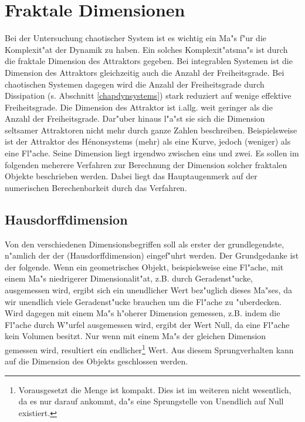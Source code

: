 
\newpage
\newpage
\section{Fraktale Dimensionen}
Bei der Untersuchung chaotischer System ist es wichtig ein Ma"s f"ur die Komplexit"at der
Dynamik zu haben. Ein solches Komplexit"atsma"s ist durch die fraktale Dimension des Attraktors
gegeben. Bei integrablen Systemen ist die Dimension des Attraktors gleichzeitig auch die Anzahl der 
Freiheitsgrade. Bei chaotischen Systemen dagegen wird die Anzahl der Freiheitsgrade durch
Dissipation (s. Abschnitt \ref{chapdynsystems}) stark reduziert auf wenige effektive
Freiheitsgrade. Die Dimension des Attraktor ist i.allg. weit geringer als die Anzahl der
Freiheitsgrade. Dar"uber hinaus l"a"st sie sich  die Dimension seltsamer Attraktoren nicht
mehr durch ganze Zahlen 
beschreiben. Beispielsweise ist der Attraktor des H\'enonsystems \naja(mehr) als eine
Kurve, jedoch \naja(weniger) als eine Fl"ache. Seine Dimension liegt irgendwo zwischen
eins und zwei. Es sollen im folgenden meherere Verfahren zur Berechnung der Dimension
solcher fraktalen Objekte beschrieben werden. Dabei liegt das Hauptaugenmerk auf der
numerischen Berechenbarkeit durch das Verfahren. 

\subsection{Hausdorffdimension}
Von den verschiedenen Dimensionsbegriffen soll als erster der grundlegendste, n"amlich der 
der \begriff(Hausdorffdimension) eingef"uhrt werden.
Der Grundgedanke ist der folgende. Wenn ein geometrisches Objekt, beispielsweise eine
Fl"ache, mit einem Ma"s niedrigerer Dimensionalit"at, z.B. durch Geradenst"ucke, ausgemessen 
wird, ergibt sich ein unendlicher Wert bez"uglich dieses Ma"ses, da wir unendlich viele
Geradenst"ucke brauchen um die Fl"ache zu "uberdecken. Wird dagegen mit einem Ma"s h"oherer Dimension gemessen,
z.B. indem die Fl"ache durch W"urfel ausgemessen wird, ergibt der Wert Null, da eine
Fl"ache kein Volumen besitzt. Nur wenn mit einem 
Ma"s der gleichen Dimension gemessen wird, resultiert ein endlicher\footnote{Vorausgesetzt 
die Menge ist kompakt. Dies ist im weiteren nicht wesentlich, da es nur darauf ankommt, da"s
eine Sprungstelle von Unendlich auf Null existiert.} Wert. Aus diesem Sprungverhalten kann auf die Dimension des Objekts 
geschlossen werden.

